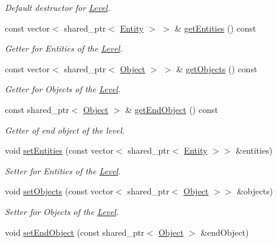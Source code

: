 \begin{DoxyCompactItemize}
\begin{DoxyCompactList}\small\item\em Default destructor for \hyperlink{classLevel}{Level}. \end{DoxyCompactList}\item 
const vector$<$ shared\+\_\+ptr$<$ \hyperlink{classEntity}{Entity} $>$ $>$ \& \hyperlink{classLevel_a2497cf10395346c9b0cf2ed193ec46d4}{get\+Entities} () const
\begin{DoxyCompactList}\small\item\em Getter for Entities of the \hyperlink{classLevel}{Level}. \end{DoxyCompactList}\item 
const vector$<$ shared\+\_\+ptr$<$ \hyperlink{classObject}{Object} $>$ $>$ \& \hyperlink{classLevel_aeb10cc133bd8e5bb64dfa98184a8dc6f}{get\+Objects} () const
\begin{DoxyCompactList}\small\item\em Getter for Objects of the \hyperlink{classLevel}{Level}. \end{DoxyCompactList}\item 
const shared\+\_\+ptr$<$ \hyperlink{classObject}{Object} $>$ \& \hyperlink{classLevel_abbd8e0af36ea7ddd23a5f340add7771f}{get\+End\+Object} () const
\begin{DoxyCompactList}\small\item\em Getter of end object of the level. \end{DoxyCompactList}\item 
void \hyperlink{classLevel_a24ca4848bfd4b00f02f677f12cda9fcf}{set\+Entities} (const vector$<$ shared\+\_\+ptr$<$ \hyperlink{classEntity}{Entity} $>$$>$ \&entities)
\begin{DoxyCompactList}\small\item\em Setter for Entities of the \hyperlink{classLevel}{Level}. \end{DoxyCompactList}\item 
void \hyperlink{classLevel_a82746a551f849962e642c288ab58b93c}{set\+Objects} (const vector$<$ shared\+\_\+ptr$<$ \hyperlink{classObject}{Object} $>$$>$ \&objects)
\begin{DoxyCompactList}\small\item\em Setter for Objects of the \hyperlink{classLevel}{Level}. \end{DoxyCompactList}\item 
void \hyperlink{classLevel_a74205a71e7c437a989666af24435bf67}{set\+End\+Object} (const shared\+\_\+ptr$<$ \hyperlink{classObject}{Object} $>$ \&end\+Object)

\end{DoxyCompactItemize}
